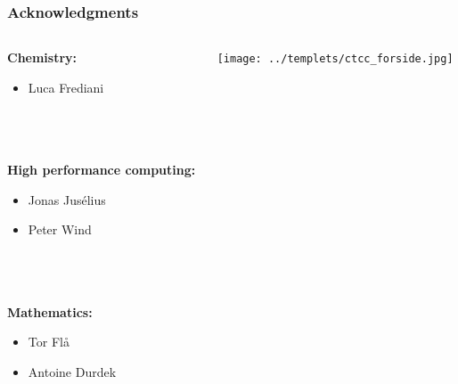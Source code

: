 \documentclass[mathserif, 8pt]{beamer}
\begin{document}
\begin{frame}
    \frametitle{Acknowledgments}
    \large
    \begin{columns}
    \begin{column}[b]{0.5\linewidth}
    \textbf{Chemistry:}
    \begin{itemize}
	\item Luca Frediani
    \end{itemize}
    \ \\
    \ \\
    \ \\
    \textbf{High performance computing:}
    \begin{itemize}
    	\item Jonas Jus\'{e}lius
    	\item Peter Wind
    \end{itemize}
    \ \\
    \ \\
    \ \\
    \textbf{Mathematics:}
    \begin{itemize}
	\item Tor Fl\aa
	\item Antoine Durdek
    \end{itemize}
    \end{column}
    \begin{column}[b]{0.5\linewidth}
	\centering
	\texttt{[image: ../templets/ctcc\_forside.jpg]}\\
	\ \\
	\ \\

\end{column}
\end{columns}
\end{frame}
\end{document}
